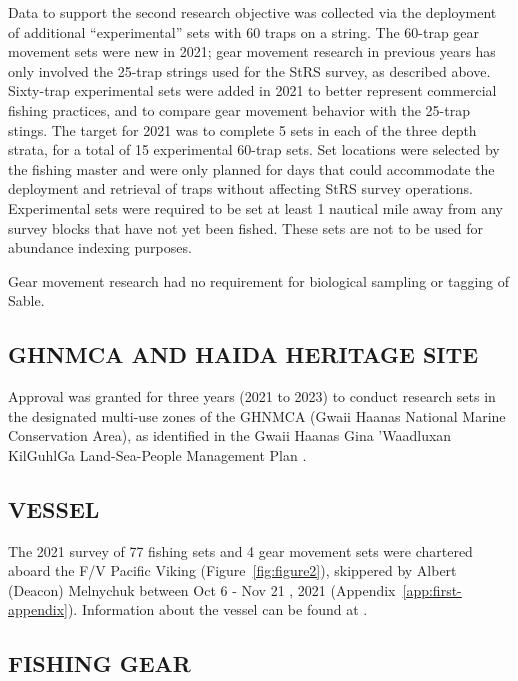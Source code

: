 \documentclass[12pt]{article}\usepackage[]{graphicx}\usepackage[]{color}
\begin{document}
Data to support the second research objective was collected via the deployment of additional ``experimental'' sets with 60 traps on a string. The 60-trap gear movement sets were new in 2021; gear movement research in previous years has only involved the 25-trap strings used for the StRS survey, as described above. Sixty-trap experimental sets were added in 2021 to better represent commercial fishing practices, and to compare gear movement behavior with the 25-trap stings. The target for 2021 was to complete 5 sets in each of the three depth strata, for a total of 15 experimental 60-trap sets. Set locations were selected by the fishing master and were only planned for days that could accommodate the deployment and retrieval of traps without affecting StRS survey operations. Experimental sets were required to be set at least 1 nautical mile away from any survey blocks that have not yet been fished. These sets are not to be used for abundance indexing purposes.

Gear movement research had no requirement for biological sampling or tagging of Sable.

\hypertarget{ghnmca-and-haida-heritage-site}{%
\subsection{GHNMCA AND HAIDA HERITAGE SITE}\label{ghnmca-and-haida-heritage-site}}

Approval was granted for three years (2021 to 2023) to conduct research sets in the designated multi-use zones of the GHNMCA (Gwaii Haanas National Marine Conservation Area), as identified in the Gwaii Haanas Gina 'Waadluxan KilGuhlGa Land-Sea-People Management Plan .

\hypertarget{vessel}{%
\subsection{VESSEL}\label{vessel}}

The 2021 survey of 77 fishing sets and 4 gear movement sets were chartered aboard the F/V Pacific Viking (Figure~\ref{fig:figure2}), skippered by Albert (Deacon) Melnychuk between Oct 6 - Nov 21 , 2021 (Appendix~\ref{app:first-appendix}). Information about the vessel can be found at .

\hypertarget{fishing-gear}{%
\subsection{FISHING GEAR}\label{fishing-gear}}
\end{document}
